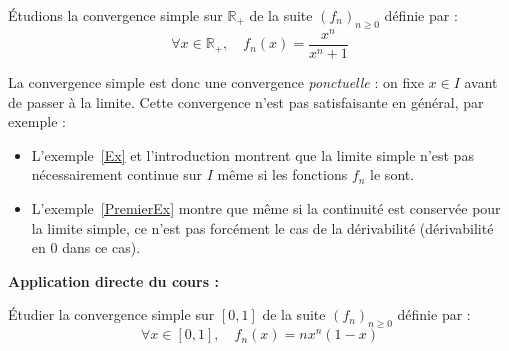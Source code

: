 \documentclass[french,11pt,twoside]{VcCours}
\newenvironment{ApplicationDirecte}{\textbf{Application directe du cours :}

}{}
\begin{document}
\begin{Exemple}\label{Ex} Étudions la convergence simple  sur $\mathbb{R}_+$ de la suite $(f_n)_{n \geq 0}$ définie par :
$$ \forall x \in \mathbb{R}_+, \quad f_n(x) = \frac{x^n}{x^n+1}$$

%
%
%
%

\vspace*{8cm}

\end{Exemple}

\begin{Remarque}{} La convergence simple est donc une convergence \emph{ponctuelle} : on fixe $x \in I$ avant de passer à la limite. Cette convergence n'est pas satisfaisante en général, par exemple :

\begin{itemize}
\item L'exemple~\ref{Ex} et l'introduction montrent que la limite simple n'est pas nécessairement continue sur $I$ même si les fonctions $f_n$ le sont.
\item L'exemple~\ref{PremierEx} montre que même si la continuité est conservée pour la limite simple, ce n'est pas forcément le cas de la dérivabilité (dérivabilité en $0$ dans ce cas).
\end{itemize}
\end{Remarque}

\begin{ApplicationDirecte} Étudier la convergence simple sur $[0,1]$ de la suite $(f_n)_{n \geq 0}$ définie par :
$$ \forall x \in [0,1], \quad f_n(x) = n x^n(1-x)$$
\end{ApplicationDirecte}
\end{document}
